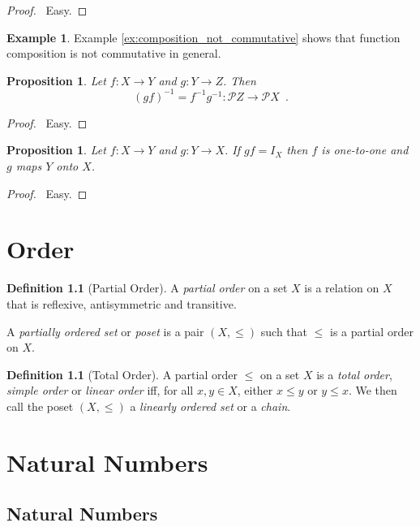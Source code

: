 \documentclass{report}
\let\qed\relax
\newtheorem{prop}[ax]{Proposition}
\theoremstyle{definition}
\newtheorem{df}[ax]{Definition}
\newtheorem{ex}[ax]{Example}
\begin{document}
\begin{proof}
\pf\ Easy. \qed
\end{proof}

\begin{ex}
Example \ref{ex:composition_not_commutative} shows that function composition is not commutative in general.
\end{ex}

\begin{prop}
Let $f : X \rightarrow Y$ and $g : Y \rightarrow Z$. Then
\[ (gf)^{-1} = f^{-1}g^{-1} : \mathcal{P} Z \rightarrow \mathcal{P} X \enspace . \]
\end{prop}

\begin{proof}
\pf\ Easy. \qed
\end{proof}

\begin{prop}
Let $f : X \rightarrow Y$ and $g : Y \rightarrow X$. If $gf = I_X$ then $f$ is one-to-one and $g$ maps $Y$ onto $X$.
\end{prop}

\begin{proof}
\pf\ Easy. \qed
\end{proof}

\chapter{Order}

\begin{df}[Partial Order]
A \emph{partial order} on a set $X$ is a relation on $X$ that is reflexive, antisymmetric and transitive.

A \emph{partially ordered set} or \emph{poset} is a pair $(X, \leq)$ such that $\leq$ is a partial order on $X$.
\end{df}

\begin{df}[Total Order]
A partial order $\leq$ on a set $X$ is a \emph{total order}, \emph{simple order} or \emph{linear order} iff, for all $x,y \in X$, either $x \leq y$ or $y \leq x$.
We then call the poset $(X, \leq)$ a \emph{linearly ordered set} or a \emph{chain}.
\end{df}

\chapter{Natural Numbers}

\section{Natural Numbers}
\end{document}
